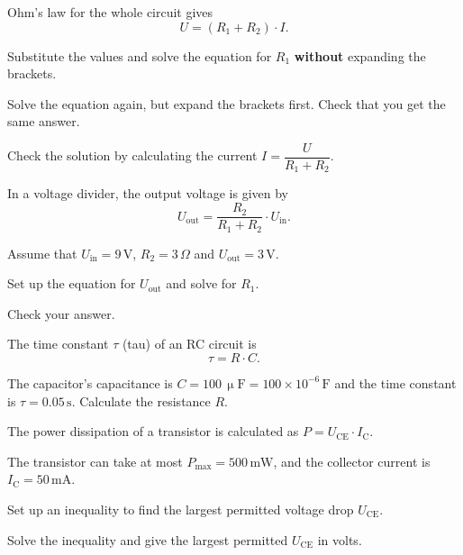 
Ohm's law for the whole circuit gives
\[
  U = (R_1 + R_2) \cdot I.
\]
\begin{parts}
  \item Substitute the values and solve the equation for $R_1$ \textbf{without} expanding the
    brackets.
  \item Solve the equation again, but expand the brackets first. Check that you get the same
    answer.
  \item Check the solution by calculating the current $I = \dfrac{U}{R_1 + R_2}$.
\end{parts}

In a voltage divider, the output voltage is given by
\[
  U_{\text{out}} = \frac{R_2}{R_1 + R_2} \cdot U_{\text{in}}.
\]


Assume that $U_{\text{in}} = 9\,\text{V}$, $R_2 = 3\,\Omega$ and $U_{\text{out}} = 3\,\text{V}$.
\begin{parts}
  \item Set up the equation for $U_{\text{out}}$ and solve for $R_1$.
  \item Check your answer.
\end{parts}

The time constant $\tau$ (tau) of an RC circuit is
\[
  \tau = R \cdot C.
\]


The capacitor's capacitance is $C = 100\,\upmu\text{F} = 100 \times 10^{-6}\,\text{F}$ and the
time constant is $\tau = 0.05\,\text{s}$. Calculate the resistance $R$.

The power dissipation of a transistor is calculated as $P = U_{\text{CE}} \cdot I_{\text{C}}$.


The transistor can take at most $P_{\max} = 500\,\text{mW}$, and the collector current is
$I_{\text{C}} = 50\,\text{mA}$.
\begin{parts}
  \item Set up an inequality to find the largest permitted voltage drop $U_{\text{CE}}$.
  \item Solve the inequality and give the largest permitted $U_{\text{CE}}$ in volts.
\end{parts}

